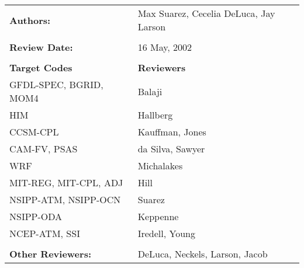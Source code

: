 
\begin{tabular}{l l}

{\bf Authors:} & Max Suarez, Cecelia DeLuca, Jay Larson \\ \\

{\bf Review Date:}            & 16 May, 2002 \\ \\

{\bf Target Codes}            & {\bf Reviewers} \\
GFDL-SPEC, BGRID, MOM4        & Balaji \\ 
HIM                           & Hallberg \\
CCSM-CPL                      & Kauffman, Jones \\
CAM-FV, PSAS                  & da Silva, Sawyer \\
WRF                           & Michalakes \\
MIT-REG, MIT-CPL, ADJ         & Hill \\
NSIPP-ATM, NSIPP-OCN          & Suarez \\
NSIPP-ODA                     & Keppenne \\
NCEP-ATM, SSI                 & Iredell, Young \\ \\

{\bf Other Reviewers:}        & DeLuca, Neckels, Larson, Jacob

\end{tabular}

